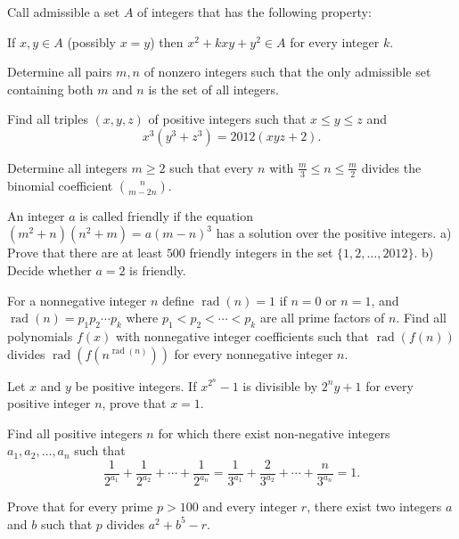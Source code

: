 
\item[\textbf{N1.}]
Call admissible a set 
$A$
 of integers that has the following property:


If 
$x,y \in A$
 (possibly 
$x=y$)
 then 
$x^2+kxy+y^2 \in A$
 for every integer 
$k$.


Determine all pairs 
$m,n$
 of nonzero integers such that the only admissible set containing both 
$m$
 and 
$n$
 is the set of all integers.

\item[\textbf{N2.}]
Find all triples 
$(x,y,z)$
 of positive integers such that 
$x \leq y \leq z$
 and
\[x^3(y^3+z^3)=2012(xyz+2).\]

\item[\textbf{N3.}]
Determine all integers 
$m \geq 2$
 such that every 
$n$
 with 
$\frac{m}{3} \leq n \leq \frac{m}{2}$
 divides the binomial coefficient 
$\binom{n}{m-2n}$.

\item[\textbf{N4.}]
An integer 
$a$
 is called friendly if the equation 
$(m^2+n)(n^2+m)=a(m-n)^3$
 has a solution over the positive integers.
a)
 Prove that there are at least 
$500$
 friendly integers in the set 
$\{ 1,2,\ldots ,2012\}$.
b)
 Decide whether 
$a=2$
 is friendly.

\item[\textbf{N5.}]
For a nonnegative integer 
$n$
 define 
$\operatorname{rad}(n)=1$
 if 
$n=0$
 or 
$n=1$, 
 and 
$\operatorname{rad}(n)=p_1p_2\cdots p_k$
 where 
$p_1<p_2<\cdots <p_k$
 are all prime factors of 
$n$.
 Find all polynomials 
$f(x)$
 with nonnegative integer coefficients such that 
$\operatorname{rad}(f(n))$
 divides 
$\operatorname{rad}(f(n^{\operatorname{rad}(n)}))$
 for every nonnegative integer 
$n$.

\item[\textbf{N6.}]
Let 
$x$
 and 
$y$
 be positive integers. If 
${x^{2^n}}-1$
 is divisible by 
$2^ny+1$
 for every positive integer 
$n$, 
 prove that 
$x=1$.

\item[\textbf{N7.}]
Find all positive integers 
$n$
 for which there exist non-negative integers 
$a_1, a_2, \ldots, a_n$
 such that
\[
\frac{1}{2^{a_1}} + \frac{1}{2^{a_2}} + \cdots + \frac{1}{2^{a_n}} = 
\frac{1}{3^{a_1}} + \frac{2}{3^{a_2}} + \cdots + \frac{n}{3^{a_n}} = 1.
\]

\item[\textbf{N8.}]
Prove that for every prime 
$p>100$
 and every integer 
$r$, 
 there exist two integers 
$a$
 and 
$b$
 such that 
$p$
 divides 
$a^2+b^5-r$.
